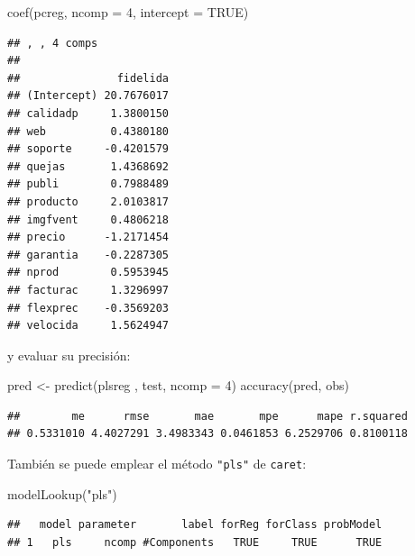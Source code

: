 \documentclass[
]{book}
\newenvironment{Shaded}{\begin{snugshade}}{\end{snugshade}}
\newcommand{\AttributeTok}[1]{\textcolor[rgb]{0.77,0.63,0.00}{#1}}
\newcommand{\ConstantTok}[1]{\textcolor[rgb]{0.00,0.00,0.00}{#1}}
\newcommand{\DecValTok}[1]{\textcolor[rgb]{0.00,0.00,0.81}{#1}}
\newcommand{\FunctionTok}[1]{\textcolor[rgb]{0.00,0.00,0.00}{#1}}
\newcommand{\NormalTok}[1]{#1}
\newcommand{\OtherTok}[1]{\textcolor[rgb]{0.56,0.35,0.01}{#1}}
\newcommand{\StringTok}[1]{\textcolor[rgb]{0.31,0.60,0.02}{#1}}
\theoremstyle{break}
\theoremstyle{definition}
\theoremstyle{definition}
\theoremstyle{definition}
\theoremstyle{definition}
\theoremstyle{remark}
\begin{document}
\begin{Shaded}
\begin{Highlighting}[]
\FunctionTok{coef}\NormalTok{(pcreg, }\AttributeTok{ncomp =} \DecValTok{4}\NormalTok{, }\AttributeTok{intercept =} \ConstantTok{TRUE}\NormalTok{)}
\end{Highlighting}
\end{Shaded}

\begin{verbatim}
## , , 4 comps
## 
##               fidelida
## (Intercept) 20.7676017
## calidadp     1.3800150
## web          0.4380180
## soporte     -0.4201579
## quejas       1.4368692
## publi        0.7988489
## producto     2.0103817
## imgfvent     0.4806218
## precio      -1.2171454
## garantia    -0.2287305
## nprod        0.5953945
## facturac     1.3296997
## flexprec    -0.3569203
## velocida     1.5624947
\end{verbatim}

y evaluar su precisión:

\begin{Shaded}
\begin{Highlighting}[]
\NormalTok{pred }\OtherTok{\textless{}{-}} \FunctionTok{predict}\NormalTok{(plsreg , test, }\AttributeTok{ncomp =} \DecValTok{4}\NormalTok{)}
\FunctionTok{accuracy}\NormalTok{(pred, obs)}
\end{Highlighting}
\end{Shaded}

\begin{verbatim}
##        me      rmse       mae       mpe      mape r.squared 
## 0.5331010 4.4027291 3.4983343 0.0461853 6.2529706 0.8100118
\end{verbatim}

También se puede emplear el método \texttt{"pls"} de \texttt{caret}:

\begin{Shaded}
\begin{Highlighting}[]
\FunctionTok{modelLookup}\NormalTok{(}\StringTok{"pls"}\NormalTok{)}
\end{Highlighting}
\end{Shaded}

\begin{verbatim}
##   model parameter       label forReg forClass probModel
## 1   pls     ncomp #Components   TRUE     TRUE      TRUE
\end{verbatim}
\end{document}
